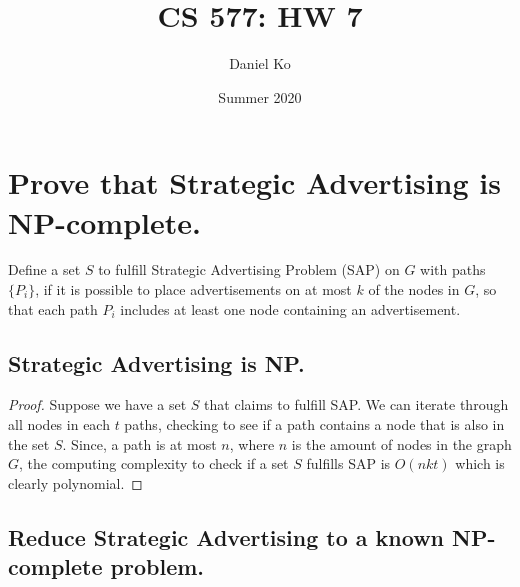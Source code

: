 \documentclass[11pt]{scrartcl}
\title{CS 577: HW 7}
\author{Daniel Ko}
\date{Summer 2020}
\begin{document}
\maketitle

\section{
  Prove that Strategic Advertising is NP-complete.
 }
Define a set $S$ to fulfill Strategic Advertising Problem (SAP) on $G$ with paths $\{P_i\}$,
if it is possible to place advertisements on at most $k$ of the nodes in $G$, so that each path $P_i$
includes at least one node containing an advertisement.

\subsection{
	Strategic Advertising is NP.
}
\begin{proof}
	Suppose we have a set $S$ that claims to fulfill SAP.
	We can iterate through all nodes in each $t$ paths, checking to see if a path contains a node
	that is also in the set $S$. Since, a path is at most $n$, where $n$ is the amount of nodes in the
	graph $G$, the computing complexity to check if a set $S$ fulfills SAP
	is $O(nkt)$ which is clearly polynomial.

\end{proof}

\subsection{
	Reduce Strategic Advertising to a known NP-complete problem.
}
\end{document}
